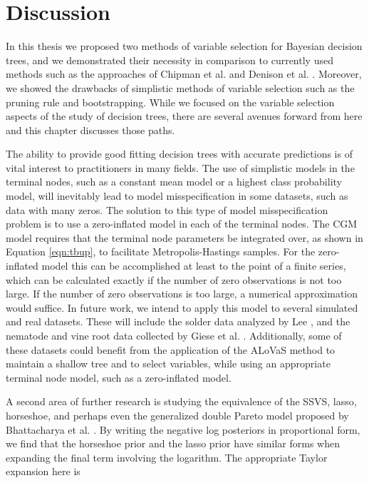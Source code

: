 \chapter{Discussion}
\label{ch:discuss}
 
In this thesis we proposed two methods of variable selection for Bayesian decision trees, and we demonstrated their necessity in comparison to currently used methods such as  the approaches of Chipman et al. \cite{chipman1998bayesian} and Denison et al. \cite{denison1998bayesian}. Moreover, we showed the drawbacks of simplistic methods of variable selection such as the pruning rule and bootstrapping. While we focused on the variable selection aspects of the study of decision trees, there are several avenues forward from here and this chapter discusses those paths. 

The ability to provide good fitting decision trees with accurate predictions is of vital interest to practitioners in many fields. The use of simplistic models in the terminal nodes, such as a constant mean model or a highest class probability model, will inevitably lead to model misspecification in some datasets, such as data with many zeros. The solution to this type of model misspecification problem is to use a zero-inflated model in each of the terminal nodes. The CGM model requires  that the terminal node parameters be integrated over, as shown in Equation \ref{eqn:tbup}, to facilitate Metropolis-Hastings samples. For the zero-inflated model this can be accomplished at least to the point of a finite series, which can be calculated exactly if the number of zero observations is not too large. If the number of zero observations is too large, a numerical approximation would suffice. In future work, we intend to apply this model to several simulated and real datasets. These will include the solder data analyzed by Lee \cite{lee2006decision}, and the nematode and vine root data collected by Giese et al. \cite{giese2014,giese2014complete}. Additionally, some of these datasets could benefit from the application of the ALoVaS method to maintain a shallow tree and to select variables, while using an appropriate terminal node model, such as a zero-inflated model.  

A second area of further research is studying the equivalence of the SSVS, lasso, horseshoe, and perhaps even the generalized double Pareto model proposed by Bhattacharya et al. \cite{bhattacharya2012bayesian}. By writing the negative log posteriors in proportional form, we find that the horseshoe prior and the lasso prior have similar forms when expanding the final term involving the logarithm. The appropriate Taylor expansion here is 

